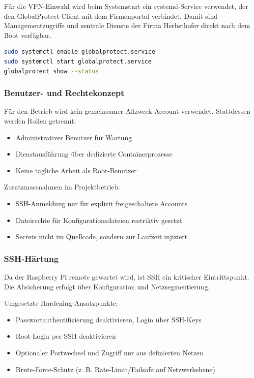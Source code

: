 Für die VPN-Einwahl wird beim Systemstart ein systemd-Service verwendet, der den GlobalProtect-Client mit dem Firmenportal verbindet. Damit sind Managementzugriffe und zentrale Dienste der Firma Herbsthofer direkt nach dem Boot verfügbar.

\begin{lstlisting}[language=bash,caption={Beispielhafter GlobalProtect-Autostart per systemd},label={lst:globalprotect_autostart},basicstyle=\ttfamily\small]
sudo systemctl enable globalprotect.service
sudo systemctl start globalprotect.service
globalprotect show --status
\end{lstlisting}

\subsubsection{Benutzer- und Rechtekonzept}

Für den Betrieb wird kein gemeinsamer Allzweck-Account verwendet. Stattdessen werden Rollen getrennt:

\begin{itemize}
    \item Administrativer Benutzer für Wartung
    \item Dienstausführung über dedizierte Containerprozesse
    \item Keine tägliche Arbeit als Root-Benutzer
\end{itemize}

Zusatzmassnahmen im Projektbetrieb:

\begin{itemize}
    \item SSH-Anmeldung nur für explizit freigeschaltete Accounts
    \item Dateirechte für Konfigurationsdateien restriktiv gesetzt
    \item Secrets nicht im Quellcode, sondern zur Laufzeit injiziert
\end{itemize}

\subsubsection{SSH-Härtung}

Da der Raspberry Pi remote gewartet wird, ist SSH ein kritischer Eintrittspunkt. Die Absicherung erfolgt über Konfiguration und Netzsegmentierung.

Umgesetzte Hardening-Ansatzpunkte:

\begin{itemize}
    \item Passwortauthentifizierung deaktivieren, Login über SSH-Keys
    \item Root-Login per SSH deaktivieren
    \item Optionaler Portwechsel und Zugriff nur aus definierten Netzen
    \item Brute-Force-Schutz (z. B. Rate-Limit/Failsafe auf Netzwerkebene)
\end{itemize}

